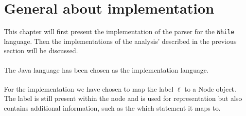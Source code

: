 % 	
% 	
% 
% 
% 
% 

{\setlength{\chapterfontsize}{24pt}
\chapter{General about implementation}
}
This chapter will first present the implementation of the parser for the \texttt{While} language. Then the implementations of the analysis' described in the previous section will be discussed.
\\\\
The Java language has been chosen as the implementation language.
\\\\
For the implementation we have chosen to map the label $\ell$ to a Node object. The label is still present within the node and is used for representation but also contains additional information, such as the which statement it maps to.

